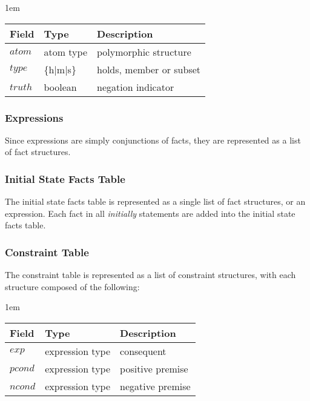 \documentclass[11pt, twocolumn]{article}
\newenvironment{vquote}
  {\begin{list}{}{\leftmargin 1em}\item[]}
  {\end{list}}
\begin{document}
        \begin{vquote}
          \begin{tabular}[t]{|l|l|l|}
            \hline
            \textbf{Field} & \textbf{Type} & \textbf{Description} \\
            \hline
            $atom$ & atom type & polymorphic structure \\
            \hline
            $type$ & \{h$|$m$|$s\} & holds, member or subset \\
            \hline
            $truth$ & boolean & negation indicator \\
            \hline
          \end{tabular}
        \end{vquote}

      \subsubsection{Expressions}

        Since expressions are simply conjunctions of facts, they are
        represented as a list of fact structures.

      \subsubsection{Initial State Facts Table}

        The initial state facts table is represented as a single list of
        fact structures, or an expression. Each fact in all {\em initially}
        statements are added into the initial state facts table.

      \subsubsection{Constraint Table}

        The constraint table is represented as a list of constraint
        structures, with each structure composed of the following:

        \begin{vquote}
          \begin{tabular}[t]{|l|l|l|}
            \hline
            \textbf{Field} & \textbf{Type} & \textbf{Description} \\
            \hline
            $exp$ & expression type & consequent \\
            \hline
            $pcond$ & expression type & positive premise \\
            \hline
            $ncond$ & expression type & negative premise \\
            \hline
          \end{tabular}
        \end{vquote}
\end{document}
